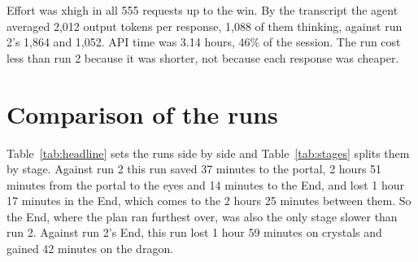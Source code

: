 \documentclass[11pt,a4paper]{article}
\begin{document}
Effort was xhigh in all 555 requests up to the win. By the transcript the agent averaged 2,012 output tokens per response, 1,088 of them thinking, against run 2's 1,864 and 1,052. API time was 3.14 hours, 46\% of the session. The run cost less than run 2 because it was shorter, not because each response was cheaper.

\section{Comparison of the runs}
\label{sec:compare}

Table~\ref{tab:headline} sets the runs side by side and Table~\ref{tab:stages} splits them by stage. Against run 2 this run saved 37 minutes to the portal, 2 hours 51 minutes from the portal to the eyes and 14 minutes to the End, and lost 1 hour 17 minutes in the End, which comes to the 2 hours 25 minutes between them. So the End, where the plan ran furthest over, was also the only stage slower than run 2. Against run 2's End, this run lost 1 hour 59 minutes on crystals and gained 42 minutes on the dragon.
\end{document}
